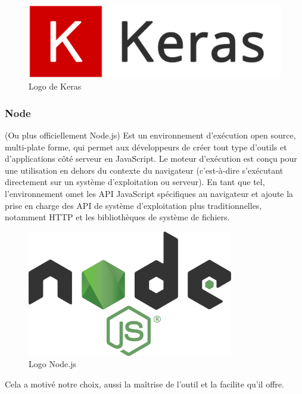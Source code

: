 \documentclass[12pt]{article}
\begin{document}
\begin{figure}[h]
	\centering
	\includegraphics[width=12cm]{img-Chapiter-4/keras.png}
	\caption{Logo de Keras}
\end{figure}

\subsubsection*{Node}
(Ou plus officiellement Node.js) Est un environnement d'exécution open source, multi-plate forme, qui permet aux développeurs de créer tout type d'outils et d'applications côté serveur en JavaScript. Le moteur d’exécution est conçu pour une utilisation en dehors du contexte du navigateur (c’est-à-dire s’exécutant directement sur un système d’exploitation ou serveur). En tant que tel, l'environnement omet les API JavaScript spécifiques au navigateur et ajoute la prise en charge des API de système d'exploitation plus traditionnelles, notamment HTTP et les bibliothèques de système de fichiers.

\begin{figure}[h]
	\centering
	\includegraphics[width=9cm]{img-Chapiter-4/nodejs.png}
	\caption{Logo Node.js}
\end{figure}

Cela a motivé notre choix, aussi la maîtrise de l’outil et la facilite qu'il offre.
\end{document}
